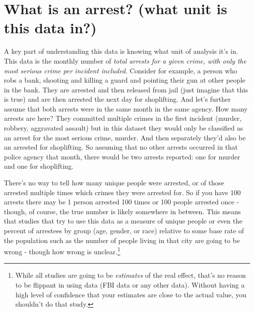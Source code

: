 \documentclass[
  12pt,
  openany]{book}
\begin{document}
\section{What is an arrest? (what unit is this data in?)}\label{what-is-an-arrest-what-unit-is-this-data-in}

A key part of understanding this data is knowing what unit of analysis it's in. This data is the monthly number of \emph{total arrests for a given crime, with only the most serious crime per incident included}. Consider for example, a person who robs a bank, shooting and killing a guard and pointing their gun at other people in the bank. They are arrested and then released from jail (just imagine that this is true) and are then arrested the next day for shoplifting. And let's further assume that both arrests were in the same month in the same agency. How many arrests are here? They committed multiple crimes in the first incident (murder, robbery, aggravated assault) but in this dataset they would only be classified as an arrest for the most serious crime, murder. And then separately they'd also be an arrested for shoplifting. So assuming that no other arrests occurred in that police agency that month, there would be two arrests reported: one for murder and one for shoplifting.

There's no way to tell how many unique people were arrested, or of those arrested multiple times which crimes they were arrested for. So if you have 100 arrests there may be 1 person arrested 100 times or 100 people arrested once - though, of course, the true number is likely somewhere in between. This means that studies that try to use this data as a measure of unique people or even the percent of arrestees by group (age, gender, or race) relative to some base rate of the population such as the number of people living in that city are going to be wrong - though how wrong is unclear.\footnote{While all studies are going to be \emph{estimates} of the real effect, that's no reason to be flippant in using data (FBI data or any other data). Without having a high level of confidence that your estimates are close to the actual value, you shouldn't do that study.}
\end{document}
